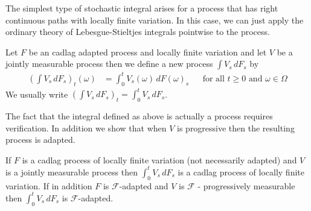 The simplest type of stochastic integral arises for a process that has right continuous paths with locally finite variation.  In this case, we can just apply the ordinary theory of Lebesgue-Stieltjes integrals pointwise to the process.  
\begin{defn}Let $F$ be an cadlag adapted process and locally finite variation and let $V$ be a jointly measurable process then we define a new process $\int V_s \, dF_s$ by
\begin{align*}
\left(\int V_s \, dF_s\right)_t(\omega) &= \int_0^t V_s(\omega) \, dF(\omega)_s && \text{for all $t \geq 0$ and $\omega \in \Omega$}
\end{align*}
We usually write $\left(\int V_s \, dF_s\right)_t = \int_0^t V_s \, dF_s$.
\end{defn}

The fact that the integral defined as above is actually a process requires verification.  In addition we show that when $V$ is progressive then the resulting process is adapted.
\begin{lem}\label{StochasticStieltjesIntegral}If $F$ is a cadlag process of locally finite variation (not necessarily adapted) and $V$ is a jointly measurable process then $\int_0^t V_s \, dF_s$ is a cadlag process of locally finite variation.  If in addition $F$ is $\mathcal{F}$-adapted and $V$ is $\mathcal{F}$ - progressively measurable then $\int_0^t V_s \, dF_s$ is $\mathcal{F}$-adapted.
\end{lem}
